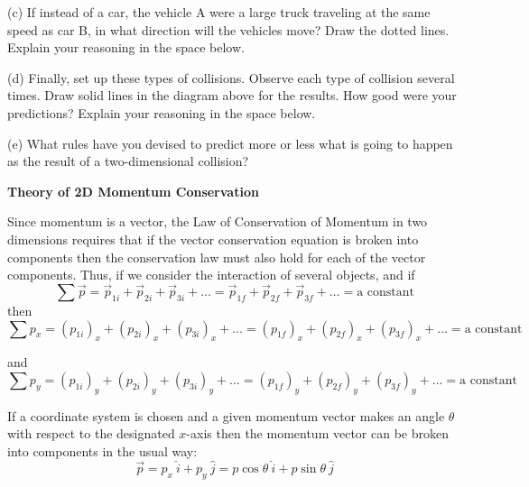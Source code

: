 (c) If instead of a car, the vehicle A were a large truck traveling at the same
speed as car B, in what direction will the vehicles move? Draw the dotted lines.
Explain your reasoning in the space below.
\answerspace{15mm}


(d) Finally, set up these types of collisions. Observe each type of collision
several times. Draw solid lines in the diagram above for the results. How good
were your predictions? Explain your reasoning in the space below.
\answerspace{15mm}

(e) What rules have you devised to predict more or less what is going to happen
as the result of a two-dimensional collision?
\answerspace{10mm}

\pagebreak[2]
\textbf{Theory of 2D Momentum Conservation }

Since momentum is a vector, the Law of Conservation of Momentum in two dimensions
requires that if the vector conservation equation is broken into components
then the conservation law must also hold for each of the vector components.
Thus, if we consider the interaction of several objects, and if 
\[
\sum {\vec p}={{\vec p}_{1i}}+{{\vec p}_{2i}}+{{\vec p}_{3i}}+\ldots ={{\vec p}_{1f}}+{{\vec p}_{2f}}+{{\vec p}_{3f}}+\ldots =\mbox{a constant}\]
then
\[
\sum p_{x}=(p_{1i})_{x}+(p_{2i})_{x}+(p_{3i})_{x}+\ldots = (p_{1f})_{x}+(p_{2f})_{x}+(p_{3f})_{x}+\ldots =
\mbox{a constant}\]


and
\[
\sum p_{y}=(p_{1i})_{y}+(p_{2i})_{y}+(p_{3i})_{y}+\ldots = (p_{1f})_{y}+(p_{2f})_{y}+(p_{3f})_{y}+\ldots =
\mbox{a constant}\]


If a coordinate system is chosen and a given momentum vector makes an angle
\( \theta  \) with respect to the designated $x$-axis then the momentum vector
can be broken into components in the usual way:
\[
{\vec p}=p_{x}~\widehat{i}+p_{y}~\widehat{ j}=p\cos \theta~\widehat{ i}+
p\sin \theta~\widehat{ j}\]



